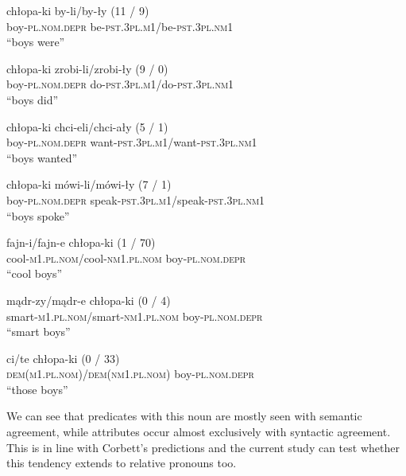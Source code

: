 \begin{exe}
  \ex\label{ex:chlopaki-pred}
  \begin{xlist}
    \ex 
    \gll chłopa-ki by-li/by-ły (11 / 9)\\
    boy\textsc{-pl.nom.depr} be\textsc{-pst.3pl.m1}/be\textsc{-pst.3pl.nm1}\\
    \glt ``boys were''

    \ex 
    \gll chłopa-ki zrobi-li/zrobi-ły (9 / 0)\\
    boy\textsc{-pl.nom.depr} do\textsc{-pst.3pl.m1}/do\textsc{-pst.3pl.nm1}\\
    \glt ``boys did''

    \ex 
    \gll chłopa-ki chci-eli/chci-ały (5 / 1)\\
    boy\textsc{-pl.nom.depr} want\textsc{-pst.3pl.m1}/want\textsc{-pst.3pl.nm1}\\
    \glt ``boys wanted''

    \ex 
    \gll chłopa-ki mówi-li/mówi-ły (7 / 1)\\
    boy\textsc{-pl.nom.depr} speak\textsc{-pst.3pl.m1}/speak\textsc{-pst.3pl.nm1}\\
    \glt ``boys spoke''
  \end{xlist}
\end{exe}

\begin{exe}
  \ex\label{ex:chlopaki-attr}
  \begin{xlist}
    \ex 
    \gll fajn-i/fajn-e chłopa-ki (1 / 70)\\
    cool\textsc{-m1.pl.nom}/cool\textsc{-nm1.pl.nom} boy\textsc{-pl.nom.depr} \\
    \glt ``cool boys''

    \ex 
    \gll mądr-zy/mądr-e chłopa-ki (0 / 4)\\
    smart\textsc{-m1.pl.nom}/smart\textsc{-nm1.pl.nom} boy\textsc{-pl.nom.depr} \\
    \glt ``smart boys''

    \ex 
    \gll ci/te chłopa-ki (0 / 33)\\
    \textsc{dem(m1.pl.nom)}/\textsc{dem(nm1.pl.nom)} boy\textsc{-pl.nom.depr} \\
    \glt ``those boys''
  \end{xlist}
\end{exe}

We can see that predicates with this noun are mostly seen with semantic agreement, while attributes occur almost exclusively with syntactic agreement. This is in line with Corbett's predictions and the current study can test whether this tendency extends to relative pronouns too.

